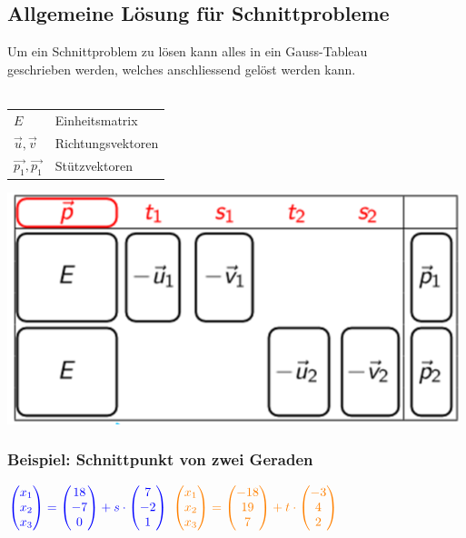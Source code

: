 		    
		    
		    


		    

		    
			\subsection{Allgemeine Lösung für Schnittprobleme}	
			Um ein Schnittproblem zu lösen kann alles in ein Gauss-Tableau \\
			geschrieben werden, welches anschliessend gelöst werden kann. \\
			\\
			\begin{tabular}{ll}
			$E$ & Einheitsmatrix  \\ 
			$\vec{u}, \vec{v}$ & Richtungsvektoren \\
			$\vec{p_1}, \vec{p_1} $ & Stützvektoren \\
			\end{tabular}
			
			\includegraphics[width=0.7\linewidth]{Bilder/schnittpunkt-tableau} 
			
			
			\subsubsection{Beispiel: Schnittpunkt von zwei Geraden}
			
			
		$\textcolor{blue}{\begin{pmatrix} x_1 \\ x_2 \\ x_3 \end{pmatrix} = \begin{pmatrix} 18 \\ -7 \\ 0 \end{pmatrix} + s \cdot \begin{pmatrix} 7 \\ -2 \\ 1\end{pmatrix}}$ \qquad $\textcolor{orange}{\begin{pmatrix} x_1 \\ x_2 \\ x_3 \end{pmatrix} = \begin{pmatrix} -18 \\ 19 \\ 7 \end{pmatrix} + t \cdot \begin{pmatrix} -3 \\ 4 \\ 2\end{pmatrix}}$ \\
		
